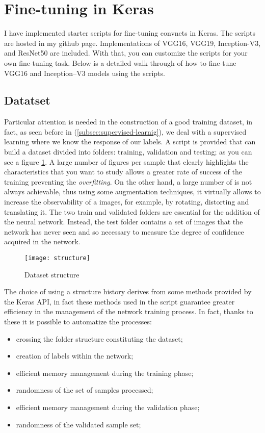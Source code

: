 \section{Fine-tuning in Keras}
\label{sec:finetuningkeras}
%
I have implemented starter scripts for fine-tuning convnets in Keras. 
The scripts are hosted in my github page.
Implementations of VGG16, VGG19, Inception-V3, and ResNet50 are included. 
With that, you can customize the scripts for your own fine-tuning task.
Below is a detailed walk through of how to fine-tune VGG16 and Inception--V3 
models using the scripts.
%
\subsection{Datatset}
\label{subsec:dataset}
Particular attention is needed in the construction of a good training dataset, 
in fact, as seen before in (\ref{subsec:supervised-learnig}), we deal with a 
supervised learning where we know the response of our labels.
A script is provided that can build a dataset divided into folders: training, 
validation and testing; as you can see a figure \ref{fig:datasetstructure}.
A large number of figures per sample that clearly highlights the characteristics 
that you want to study allows a greater rate of success of the training 
preventing the \emph{overfitting}.
On the other hand, a large number of is not always achievable, thus using some 
augmentation techniques, it virtually allows to increase the observability of a 
images, for example, by rotating, distorting and translating it.
The two train and validated folders are essential for the addition of the 
neural network.
Instead, the test folder contains a set of images that the network has never 
seen and so necessary to measure the degree of confidence acquired in the network.
%
\begin{figure}[htb]
\centering
\texttt{[image: structure]}
\caption{Dataset structure}
\label{fig:datasetstructure}
\end{figure}
%
The choice of using a structure history derives from some methods provided by 
the Keras API, in fact these methods used in the script guarantee greater 
efficiency in the management of the network training process.
In fact, thanks to these it is possible to automatize the processes:
\begin{itemize}
\item crossing the folder structure constituting the dataset;
\item creation of labels within the network;
\item efficient memory management during the training phase;
\item randomness of the set of samples processed;
\item efficient memory management during the validation phase;
\item randomness of the validated sample set;
\end{itemize}
%
